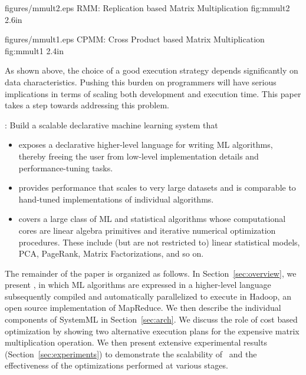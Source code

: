 
\customizedfig
{figures/mmult2.eps}
{RMM: Replication based Matrix Multiplication}
{fig:mmult2}
{2.6in}

\customizedfig
{figures/mmult1.eps}
{CPMM: Cross Product based Matrix Multiplication}
{fig:mmult1}
{2.4in}

As shown above, the choice of a good execution strategy depends 
significantly on data characteristics. 
Pushing this burden on programmers will have serious
implications in terms of scaling both development and execution time. 
This paper takes a step towards addressing this problem. 

: Build a scalable declarative machine
learning system that
\begin{itemize}
\item exposes a declarative higher-level language for writing ML algorithms, thereby 
freeing the user from low-level implementation details and performance-tuning tasks. 
\item provides performance that scales to very large datasets and is comparable to hand-tuned implementations of individual algorithms.
\item covers a large class of ML and statistical algorithms whose computational cores are linear algebra primitives and iterative numerical optimization procedures. These include (but are not restricted to) linear statistical models, PCA, PageRank, Matrix Factorizations, and so on. 
\end{itemize}
 
The remainder of the paper is organized as follows. In Section~\ref{sec:overview}, we
present \systemml, in which ML algorithms are expressed in a higher-level language subsequently compiled and automatically parallelized to execute in Hadoop, an open source implementation of MapReduce. We then
describe the individual components of SystemML in Section~\ref{sec:arch}. 
We discuss the role of cost based optimization by showing two alternative execution plans for the expensive matrix multiplication operation.
We then present extensive experimental results
(Section~\ref{sec:experiments}) to demonstrate the scalability of \systemmltext\ and the effectiveness of the optimizations performed at various stages.

